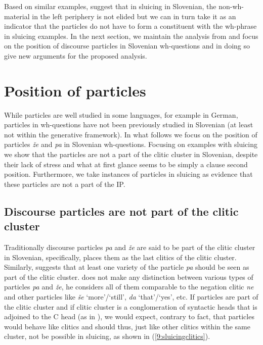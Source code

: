 \documentclass[output=paper,
modfonts,
newtxmath,
hidelinks
]{langscibook}
\begin{document}
\noindent Based on similar examples, \cite{marusicetal2015} suggest that in sluicing in Slovenian, the non-wh-material in the left periphery is not elided but we can in turn take it as an indicator that the particles do not have to form a constituent with the wh-phrase in sluicing examples. In the next section, we maintain the analysis from \cite{marusicetal2015} and focus on the position of discourse particles in Slovenian wh-questions and in doing so give new arguments for the proposed analysis.  

\section{Position of particles}\label{9:s4}

While particles are well studied in some languages, for example in German, particles in wh-questions have not been previously studied in Slovenian (at least not within the generative framework). In what follows we focus on the position of particles \textit{že} and \textit{pa} in Slovenian wh-questions. Focusing on examples with sluicing we show that the particles are not a part of the clitic cluster in Slovenian, despite their lack of stress and what at first glance seems to be simply a clause second position. Furthermore, we take instances of particles in sluicing as evidence that these particles are not a part of the IP.  

\subsection{Discourse particles are not part of the clitic cluster}

Traditionally discourse particles \textit{pa} and \textit{že} are said to be part of the clitic cluster in Slovenian, specifically, \cite{toporisic2000} places them as the last clitics of the clitic cluster. Similarly, \cite{oresnik1985naniz} suggests that at least one variety of the particle \textit{pa} should be seen as part of the clitic cluster. \cite{toporisic2000} does not make any distinction between various types of particles \textit{pa} and \textit{že}, he considers all of them comparable to the negation clitic \textit{ne} and other particles like \textit{še} `more'/`still', \textit{da} `that'/`yes', etc. If particles are part of the clitic cluster and if clitic cluster is a conglomeration of syntactic heads that is adjoined to the C head (as in \citealt{goldensheppard2000}), we would expect, contrary to fact, that particles would behave like clitics and should thus, just like other clitics within the same cluster, not be possible in sluicing, as shown in  (\ref{9:sluicingclitics}). 
\end{document}

